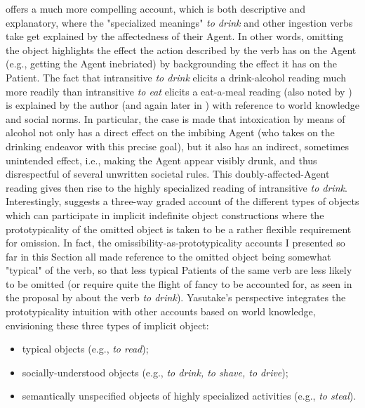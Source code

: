 \textcite[141]{Naess2007} offers a much more compelling account, which is both descriptive and explanatory, where the "specialized meanings" \textit{to drink} and other ingestion verbs take get explained by the affectedness of their Agent. In other words, omitting the object highlights the effect the action described by the verb has on the Agent (e.g., getting the Agent inebriated) by backgrounding the effect it has on the Patient. The fact that intransitive \textit{to drink} elicits a drink-alcohol reading much more readily than intransitive \textit{to eat} elicits a eat-a-meal reading (also noted by \textcite[14]{NewmanRice2006}) is explained by the author (and again later in \textcite[420]{Naess2011}) with reference to world knowledge and social norms. In particular, the case is made that intoxication by means of alcohol not only has a direct effect on the imbibing Agent (who takes on the drinking endeavor with this precise goal), but it also has an indirect, sometimes unintended effect, i.e., making the Agent appear visibly drunk, and thus disrespectful of several unwritten societal rules. This doubly-affected-Agent reading gives then rise to the highly specialized reading of intransitive \textit{to drink}.\\
Interestingly, \textcite[48-50]{Yasutake1987} suggests a three-way graded account of the different types of objects which can participate in implicit indefinite object constructions where the prototypicality of the omitted object is taken to be a rather flexible requirement for omission. In fact, the omissibility-as-prototypicality accounts I presented so far in this Section all made reference to the omitted object being somewhat "typical" of the verb, so that less typical Patients of the same verb are less likely to be omitted (or require quite the flight of fancy to be accounted for, as seen in the proposal by \textcite{HuddlestonEtAl2002} about the verb \textit{to drink}). Yasutake's perspective integrates the prototypicality intuition with other accounts based on world knowledge, envisioning these three types of implicit object:
\begin{itemize}
    \item typical objects (e.g., \textit{to read});
    \item socially-understood objects (e.g., \textit{to drink, to shave, to drive});
    \item semantically unspecified objects of highly specialized activities (e.g., \textit{to steal}).
\end{itemize}

